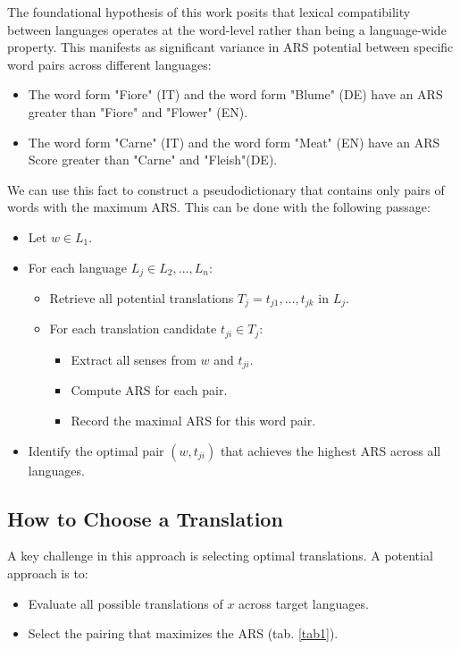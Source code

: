 \documentclass[runningheads]{llncs}
\begin{document}
The foundational hypothesis of this work posits that lexical compatibility between languages operates at the word-level rather than being a language-wide property. This manifests as significant variance in ARS potential between specific word pairs across different languages:

\begin{itemize}
  \item The word form "Fiore" (IT) and the word form "Blume" (DE) have an ARS greater than "Fiore" and "Flower" (EN). 
  \item The word form "Carne" (IT) and the word form "Meat" (EN) have an ARS Score greater than "Carne" and "Fleish"(DE). 
\end{itemize}

We can use this fact to construct a pseudodictionary that contains only pairs of words with the maximum ARS. This can be done with the following passage: 
\begin{itemize}
  \item Let $w \in L_1$.
\item For each language $L_j \in {L_2,\ldots,L_n}$:
\begin{itemize}
\item Retrieve all potential translations $T_j = {t_{j1},\ldots,t_{jk}}$ in $L_j$.
\item For each translation candidate $t_{ji} \in T_j$:
\begin{itemize}
  \item Extract all senses from $w$ and $t_{ji}$.
\item Compute ARS for each pair.
\item Record the maximal ARS for this word pair.
\end{itemize}
\end{itemize}
\item Identify the optimal pair $(w, t_{ji})$ that achieves the highest ARS across all languages.
\end{itemize}
\subsection{How to Choose a Translation}

A key challenge in this approach is selecting optimal translations. A potential approach is to:
\begin{itemize}
\item Evaluate all possible translations of $x$ across target languages.
\item Select the pairing that maximizes the ARS (tab. \ref{tab1}).
\end{itemize}
\end{document}

